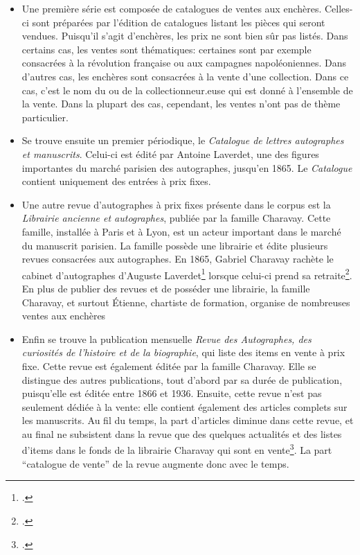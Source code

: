 \begin{itemize}
	\item Une première série est composée de catalogues de ventes aux enchères. Celles-ci sont préparées par l'édition de catalogues listant les pièces qui seront vendues. Puisqu'il s'agit d'enchères, les prix ne sont bien sûr pas listés. Dans certains cas, les ventes sont thématiques: certaines sont par exemple consacrées à la révolution française ou aux campagnes napoléoniennes. Dans d'autres cas, les enchères sont consacrées à la vente d'une collection. Dans ce cas, c'est le nom du ou de la collectionneur.euse qui est donné à l'ensemble de la vente. Dans la plupart des cas, cependant, les ventes n'ont pas de thème particulier.
	\item Se trouve ensuite un premier périodique, le \textit{Catalogue de lettres autographes et manuscrits}. Celui-ci est édité par Antoine Laverdet, une des figures importantes du marché parisien des autographes, jusqu'en 1865. Le \textit{Catalogue} contient uniquement des entrées à prix fixes.
	\item Une autre revue d'autographes à prix fixes présente dans le corpus est la \textit{Librairie ancienne et autographes}, publiée par la famille Charavay. Cette famille, installée à Paris et à Lyon, est un acteur important dans le marché du manuscrit parisien. La famille possède une librairie et édite plusieurs revues consacrées aux autographes. En 1865, Gabriel Charavay rachète le cabinet d'autographes d'Auguste Laverdet\footcite[p. 18-21]{rondeau_du_noyer_encoder_2019} lorsque celui-ci prend sa retraite\footcite[p. 3]{gabay_selling_2020}. En plus de publier des revues et de posséder une librairie, la famille Charavay, et surtout Étienne, chartiste de formation, organise de nombreuses ventes aux enchères
	\item Enfin se trouve la publication mensuelle \textit{Revue des Autographes, des curiosités de l’histoire et de la biographie}, qui liste des items en vente à prix fixe. Cette revue est également éditée par la famille Charavay. Elle se distingue des autres publications, tout d'abord par sa durée de publication, puisqu'elle est éditée entre 1866 et 1936. Ensuite, cette revue n'est pas seulement dédiée à la vente: elle contient également des articles complets sur les manuscrits. Au fil du temps, la part d'articles diminue dans cette revue, et au final ne subsistent dans la revue que des quelques actualités et des listes d'items dans le fonds de la librairie Charavay qui sont en vente\footcite[p. 3]{gabay_selling_2020}. La part \enquote{catalogue de vente} de la revue augmente donc avec le temps.
\end{itemize}

